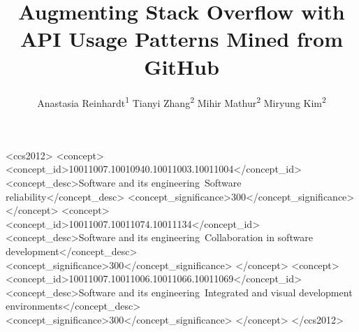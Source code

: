 \documentclass[sigconf, review]{acmart}
\begin{document}
\title{Augmenting Stack Overflow with API Usage Patterns Mined from GitHub}

\author{Anastasia Reinhardt\textsuperscript{1}\footnotemark\,\,Tianyi Zhang\textsuperscript{2}\,\,Mihir Mathur\textsuperscript{2}\,\,Miryung Kim\textsuperscript{2}}

\renewcommand{\authors}{Anastasia Reinhart, Tianyi Zhang, Mihir Mathur, and Miryung Kim}
\renewcommand{\shortauthors}{Anastasia Reinhart, Tianyi Zhang, Mihir Mathur, and Miryung Kim}


%
%
%




\begin{CCSXML}
<ccs2012>
<concept>
<concept_id>10011007.10010940.10011003.10011004</concept_id>
<concept_desc>Software and its engineering~Software reliability</concept_desc>
<concept_significance>300</concept_significance>
</concept>
<concept>
<concept_id>10011007.10011074.10011134</concept_id>
<concept_desc>Software and its engineering~Collaboration in software development</concept_desc>
<concept_significance>300</concept_significance>
</concept>
<concept>
<concept_id>10011007.10011006.10011066.10011069</concept_id>
<concept_desc>Software and its engineering~Integrated and visual development environments</concept_desc>
<concept_significance>300</concept_significance>
</concept>
</ccs2012>
\end{CCSXML}

\end{document}
